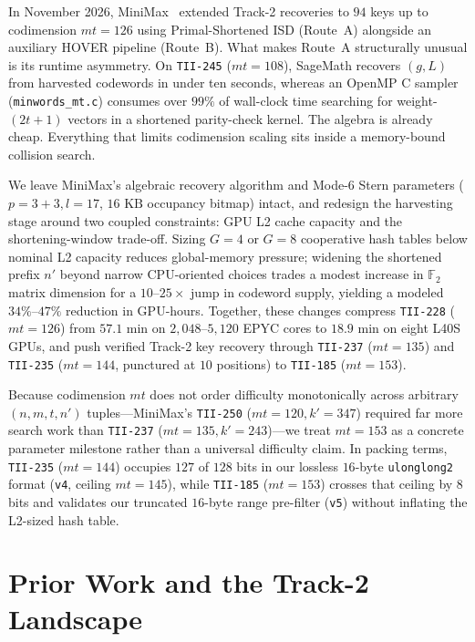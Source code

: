 \documentclass[11pt,a4paper]{article}
\begin{document}
In November 2026, MiniMax~\cite{MiniMax26} extended Track-2 recoveries to $94$ keys up to codimension $mt=126$ using Primal-Shortened ISD (Route~A) alongside an auxiliary HOVER pipeline (Route~B). What makes Route~A structurally unusual is its runtime asymmetry. On \texttt{TII-245} ($mt=108$), SageMath recovers $(g, L)$ from harvested codewords in under ten seconds, whereas an OpenMP C sampler (\texttt{minwords\_mt.c}) consumes over $99\%$ of wall-clock time searching for weight-$(2t+1)$ vectors in a shortened parity-check kernel. The algebra is already cheap. Everything that limits codimension scaling sits inside a memory-bound collision search.

We leave MiniMax's algebraic recovery algorithm and Mode-6 Stern parameters ($p=3+3, l=17$, $16\text{ KB}$ occupancy bitmap) intact, and redesign the harvesting stage around two coupled constraints: GPU L2 cache capacity and the shortening-window trade-off. Sizing $G=4$ or $G=8$ cooperative hash tables below nominal L2 capacity reduces global-memory pressure; widening the shortened prefix $n'$ beyond narrow CPU-oriented choices trades a modest increase in $\mathbb{F}_2$ matrix dimension for a $10\text{--}25\times$ jump in codeword supply, yielding a modeled $34\%\text{--}47\%$ reduction in GPU-hours. Together, these changes compress \texttt{TII-228} ($mt=126$) from $57.1\text{ min}$ on $2{,}048\text{--}5{,}120$ EPYC cores to $18.9\text{ min}$ on eight L40S GPUs, and push verified Track-2 key recovery through \texttt{TII-237} ($mt=135$) and \texttt{TII-235} ($mt=144$, punctured at $10$ positions) to \texttt{TII-185} ($mt=153$).

Because codimension $mt$ does not order difficulty monotonically across arbitrary $(n, m, t, n')$ tuples---MiniMax's \texttt{TII-250} ($mt=120, k'=347$) required far more search work than \texttt{TII-237} ($mt=135, k'=243$)---we treat $mt=153$ as a concrete parameter milestone rather than a universal difficulty claim. In packing terms, \texttt{TII-235} ($mt=144$) occupies $127$ of $128$ bits in our lossless $16$-byte \texttt{ulonglong2} format (\texttt{v4}, ceiling $mt=145$), while \texttt{TII-185} ($mt=153$) crosses that ceiling by $8$ bits and validates our truncated $16$-byte range pre-filter (\texttt{v5}) without inflating the L2-sized hash table.

\section{Prior Work and the Track-2 Landscape}
\end{document}
